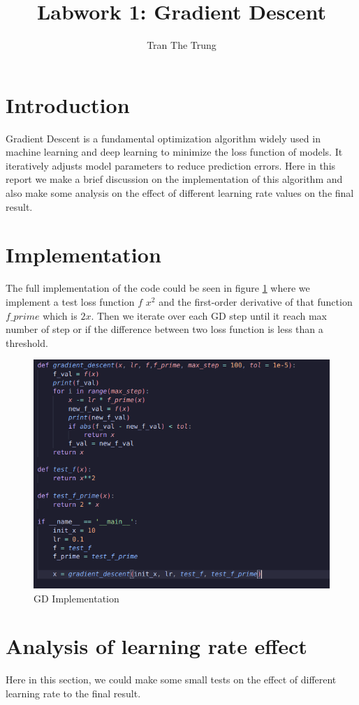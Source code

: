 \documentclass{article}
\title{Labwork 1: Gradient Descent}
\author{Tran The Trung}
\begin{document}
\maketitle

\section{Introduction}
Gradient Descent is a fundamental optimization algorithm widely used in machine learning and deep learning
to minimize the loss function of models. It iteratively adjusts model parameters to reduce prediction errors.
Here in this report we make a brief discussion on the implementation of this algorithm and also make some
analysis on the effect of different learning rate values on the final result.

\section{Implementation}
The full implementation of the code could be seen in figure \ref{fig:code} where we implement a test loss function $f$
$x^2$ and the first-order derivative of that function $f\_prime$ which is $2x$. Then we iterate over each GD 
step until it reach max number of step or if the difference between two loss function is less than a threshold.
\begin{figure}[H]
    \centering
    \includegraphics[width=0.72\linewidth]{image/code.png}
    \caption{GD Implementation}
    \label{fig:code}
\end{figure}

\section{Analysis of learning rate effect}
Here in this section, we could make some small tests on the effect of different learning rate to the final result.
\end{document}
